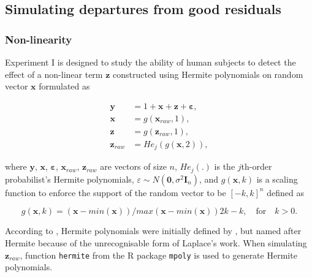 \documentclass[]{interact}
\theoremstyle{plain}%
\theoremstyle{definition}
\theoremstyle{remark}
\begin{document}
\hypertarget{simulating-departures-from-good-residuals}{%
\subsection{Simulating departures from good
residuals}\label{simulating-departures-from-good-residuals}}

\hypertarget{non-linearity}{%
\subsubsection{Non-linearity}\label{non-linearity}}

Experiment I is designed to study the ability of human subjects to
detect the effect of a non-linear term \(\boldsymbol{z}\) constructed
using Hermite polynomials on random vector \(\boldsymbol{x}\) formulated
as

\begin{align} \label{eq:nonlinearity-model}
\boldsymbol{y} &= 1 + \boldsymbol{x} + \boldsymbol{z} + \boldsymbol{\varepsilon},\\
\boldsymbol{x} &= g(\boldsymbol{x}_{raw}, 1), \\
\boldsymbol{z} &= g(\boldsymbol{z}_{raw}, 1), \\
\boldsymbol{z}_{raw} &= He_j(g(\boldsymbol{x}, 2)),
\end{align}

\noindent where \(\boldsymbol{y}\), \(\boldsymbol{x}\),
\(\boldsymbol{\varepsilon}\), \(\boldsymbol{x}_{raw}\),
\(\boldsymbol{z}_{raw}\) are vectors of size \(n\), \(He_{j}(.)\) is the
\(j\)th-order probabilist's Hermite polynomials,
\(\varepsilon \sim N(\boldsymbol{0}, \sigma^2\boldsymbol{I}_n)\), and
\(g(\boldsymbol{x}, k)\) is a scaling function to enforce the support of
the random vector to be \([-k, k]^n\) defined as

\begin{equation} \label{eq:scaling-function}
g(\boldsymbol{x}, k) = (\boldsymbol{x} - min(\boldsymbol{x}))/max(\boldsymbol{x} - min(\boldsymbol{x}))2k - k, \quad \text{for} \quad k > 0. 
\end{equation}

According to \citet{abramowitz1964handbook}, Hermite polynomials were
initially defined by \citet{de1820theorie}, but named after Hermite
\citep{hermite1864nouveau} because of the unrecognisable form of
Laplace's work. When simulating \(\boldsymbol{z}_{raw}\), function
\texttt{hermite} from the R package \texttt{mpoly} \citep{mpoly} is used
to generate Hermite polynomials.
\end{document}
